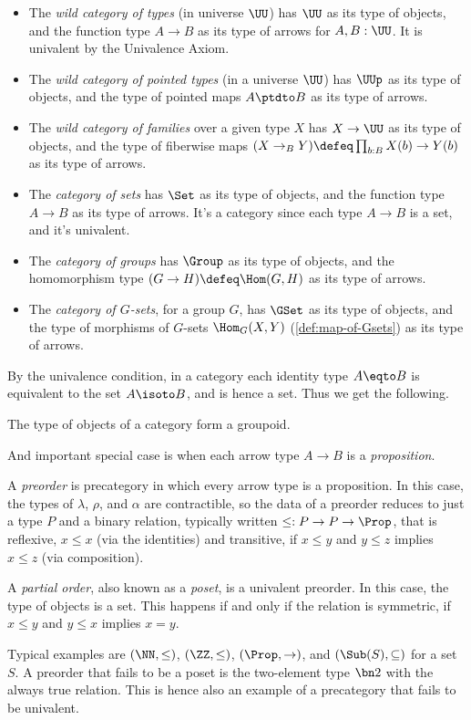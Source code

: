 \begin{itemize}
\item
  The \emph{wild category of types} (in universe $\UU$) has $\UU$
  as its type of objects, and the function type $A \to B$ as its type of arrows
  for $A,B :\UU$. It is univalent by the Univalence Axiom.
\item
  The \emph{wild category of pointed types} (in a universe $\UU$) has
  $\UUp$ as its type of objects, and the type of pointed maps $A \ptdto B$ as its type of arrows.
\item
  The \emph{wild category of families} over a given type $X$ has
  $X \to \UU$ as its type of objects, and the type of fiberwise maps
  $(X \to_B Y) \defeq \prod_{b:B}X(b) \to Y(b)$
  as its type of arrows.
\item
  The \emph{category of sets} has $\Set$
  as its type of objects, and the function type $A \to B$ as its type of arrows.
  It's a category since each type $A\to B$ is a set, and it's univalent.
\item
  The \emph{category of groups} has $\Group$
  as its type of objects, and the homomorphism type $(G \to H) \defeq \Hom(G,H)$
  as its type of arrows.
\item
  The \emph{category of $G$-sets}, for a group $G$,
  has $\GSet$ as its type of objects, and the type of morphisms of $G$-sets
  $\Hom_G(X,Y)$ (\cref{def:map-of-Gsets}) as its type of arrows.
\end{itemize}

By the univalence condition, in a category each identity type $A \eqto B$
is equivalent to the set $A \isoto B$, and is hence a set.
Thus we get the following.
\begin{lemma}
  The type of objects of a category form a groupoid.
\end{lemma}

And important special case is when each arrow type $A \to B$ is a \emph{proposition}.
\begin{example}\label{ex:poset}
  A \emph{preorder} is precategory in which every arrow type is a proposition.
  In this case, the types of $\lambda$, $\rho$, and $\alpha$ are contractible, so the data
  of a preorder reduces to just a type $P$ and a binary relation,
  typically written $\le : P \to P \to \Prop$,
  that is reflexive, $x \le x$ (via the identities)
  and transitive, \ie if $x\le y$ and $y\le z$ implies $x\le z$ (via composition).

  A \emph{partial order}, also known as a \emph{poset},
  is a univalent preorder.
  In this case, the type of objects is a set.
  This happens if and only if the relation is symmetric,
  \ie if $x \le y$ and $y \le x$ implies $x = y$.

  Typical examples are $(\NN,\le)$, $(\ZZ,\le)$, $(\Prop,\to)$,
  and $(\Sub(S),\subseteq)$ for a set $S$.
  A preorder that fails to be a poset is the two-element type $\bn 2$
  with the always true relation.
  This is hence also an example of a precategory that fails to be univalent.
\end{example}

